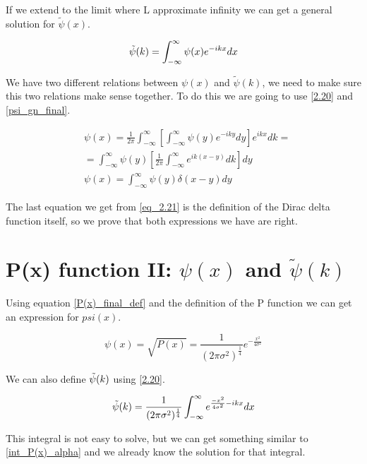 If we extend to the limit where L approximate infinity we can get a general solution for $\tilde{\psi}(x)$.

\begin{equation}
    \label{2.20}
    \Tilde{\psi}(k) = \int_{-\infty}^{\infty} \psi(x) e^{-ikx} dx
\end{equation}

We have two different relations between $\psi(x)$ and $\tilde{\psi}(k)$, we need to make sure this two relations make sense together. To do this we are going to use \ref{2.20} and \ref{psi_gn_final}.

\begin{equation}
    \label{eq_2.21}
\begin{split}
    & \psi(x) = \frac{1}{2\pi} \int_{-\infty}^{\infty} \left[ \int_{-\infty}^{\infty} \psi(y)e^{-iky}dy \right]e^{ikx}dk =
    \\
    & = \int_{-\infty}^{\infty} \psi(y) \left[ \frac{1}{2\pi} \int_{-\infty}^{\infty} e^{ik(x-y)}dk\right]dy
    \\
    & \psi(x) = \int_{-\infty}^{\infty} \psi(y) \delta(x-y) dy
    \end{split}
\end{equation}

The last equation we get from \ref{eq_2.21} is the definition of the Dirac delta function itself, so we prove that both expressions we have are right.

\section{P(x) function II: $\psi(x)$ and $\tilde{\psi}(k)$}

Using equation \ref{P(x)_final_def} and the definition of the P function we can get an expression for $psi(x)$.

\begin{equation}
    \label{2.22}
    \psi(x) = \sqrt{P(x)} = \frac{1}{(2\pi\sigma^2)^{\frac{1}{4}} } e^{-\frac{x^2}{4\sigma^2}}
\end{equation}

We can also define $\Tilde{\psi}(k)$ using \ref{2.20}.

\begin{equation}
    \label{2.23}
    \Tilde{\psi}(k) = \frac{1}{(2\pi\sigma^2)^{\frac{1}{4}} } \int_{-\infty}^{\infty} e^{\frac{-x^2}{4\sigma^2}-ikx}dx
\end{equation}

This integral is not easy to solve, but we can get something similar to \ref{int_P(x)_alpha} and we already know the solution for that integral.

